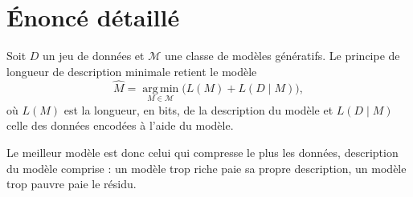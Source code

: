 \section{Énoncé détaillé}\label{mdl:enonce}

Soit $D$ un jeu de données et $\mathcal{M}$ une classe de modèles génératifs.
Le principe de longueur de description minimale retient le modèle
\[
  \hat{M} = \operatorname*{arg\,min}_{M \in \mathcal{M}} \bigl( L(M) + L(D \mid M) \bigr),
\]
où $L(M)$ est la longueur, en bits, de la description du modèle et
$L(D \mid M)$ celle des données encodées à l'aide du modèle.

Le meilleur modèle est donc celui qui compresse le plus les données,
description du modèle comprise : un modèle trop riche paie sa propre
description, un modèle trop pauvre paie le résidu.
